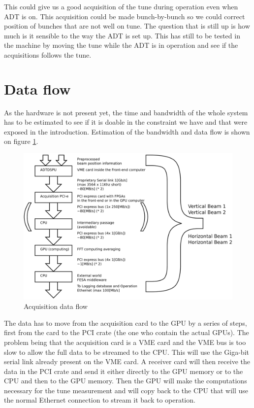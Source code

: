 	This could give us a good acquisition of the tune during operation even when \gls{ADT} is on. This acquisition could be made bunch-by-bunch so we could correct position of bunches that are not well on tune. The question that is still up is how much is it sensible to the way the \gls{ADT} is set up. This has still to be tested in the machine by moving the tune while the \gls{ADT} is in operation and see if the acquisitions follows the tune.

\section{Data flow}

As the hardware is not present yet, the time and bandwidth of the whole system has to be estimated to see if it is doable in the constraint we have and that were exposed in the introduction. Estimation of the bandwidth and data flow is shown on figure \ref{fig:data_flow}.

\begin{figure}[H]
\caption{Acquisition data flow}
\label{fig:data_flow}
\centering
\includegraphics[scale=0.3]{dataflow.pdf}
\end{figure}

The data has to move from the acquisition card to the GPU by a series of steps, first from the card to the PCI crate (the one who contain the actual \glspl{GPU}). The problem being that the acquisition card is a \gls{VME} card and the VME bus is too slow to allow the full data to be streamed to the CPU. This will use the Giga-bit serial link already present on the VME card. A receiver card will then receive the data in the PCI crate and send it either directly to the \gls{GPU} memory or to the \gls{CPU} and then to the \gls{GPU} memory. Then the \gls{GPU} will make the computations necessary for the tune measurement and will copy back to the \gls{CPU} that will use the normal Ethernet connection to stream it back to operation.

